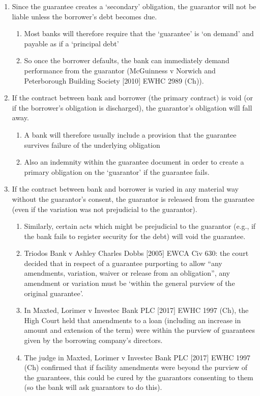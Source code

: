 \documentclass[
]{article}
\providecommand{\tightlist}{%
  \setlength{\itemsep}{0pt}\setlength{\parskip}{0pt}}
\begin{document}
\begin{enumerate}
\tightlist
\item
  Since the guarantee creates a `secondary' obligation, the guarantor
  will not be liable unless the borrower's debt becomes due.

  \begin{enumerate}
  \tightlist
  \item
    Most banks will therefore require that the `guarantee' is `on
    demand' and payable as if a `principal debt'
  \item
    So once the borrower defaults, the bank can immediately demand
    performance from the guarantor (McGuinness v Norwich and
    Peterborough Building Society {[}2010{]} EWHC 2989 (Ch)).
  \end{enumerate}
\item
  If the contract between bank and borrower (the primary contract) is
  void (or if the borrower's obligation is discharged), the guarantor's
  obligation will fall away.

  \begin{enumerate}
  \tightlist
  \item
    A bank will therefore usually include a provision that the guarantee
    survives failure of the underlying obligation
  \item
    Also an indemnity within the guarantee document in order to create a
    primary obligation on the `guarantor' if the guarantee fails.
  \end{enumerate}
\item
  If the contract between bank and borrower is varied in any material
  way without the guarantor's consent, the guarantor is released from
  the guarantee (even if the variation was not prejudicial to the
  guarantor).

  \begin{enumerate}
  \tightlist
  \item
    Similarly, certain acts which might be prejudicial to the guarantor
    (e.g., if the bank fails to register security for the debt) will
    void the guarantee.
  \item
    Triodos Bank v Ashley Charles Dobbs {[}2005{]} EWCA Civ 630: the
    court decided that in respect of a guarantee purporting to allow
    ``any amendments, variation, waiver or release from an obligation'',
    any amendment or variation must be `within the general purview of
    the original guarantee'.
  \item
    In Maxted, Lorimer v Investec Bank PLC {[}2017{]} EWHC 1997 (Ch),
    the High Court held that amendments to a loan (including an increase
    in amount and extension of the term) were within the purview of
    guarantees given by the borrowing company's directors.
  \item
    The judge in Maxted, Lorimer v Investec Bank PLC {[}2017{]} EWHC
    1997 (Ch) confirmed that if facility amendments were beyond the
    purview of the guarantees, this could be cured by the guarantors
    consenting to them (so the bank will ask guarantors to do this).
  \end{enumerate}
\end{enumerate}
\end{document}
